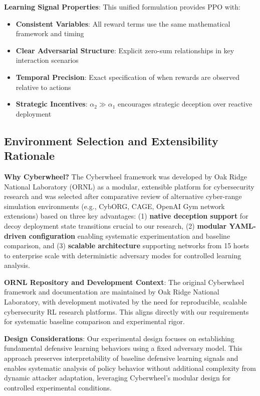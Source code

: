 \documentclass[12pt,oneside]{article}
\begin{document}
\textbf{Learning Signal Properties}:
This unified formulation provides PPO with:
\begin{itemize}
\item \textbf{Consistent Variables}: All reward terms use the same mathematical framework and timing
\item \textbf{Clear Adversarial Structure}: Explicit zero-sum relationships in key interaction scenarios
\item \textbf{Temporal Precision}: Exact specification of when rewards are observed relative to actions
\item \textbf{Strategic Incentives}: $\alpha_2 \gg \alpha_1$ encourages strategic deception over reactive deployment
\end{itemize}


\subsection{Environment Selection and Extensibility Rationale}

\textbf{Why Cyberwheel?} The Cyberwheel framework was developed by Oak Ridge National Laboratory (ORNL) as a modular, extensible platform for cybersecurity research and was selected after comparative review of alternative cyber-range simulation environments (e.g., CybORG, CAGE, OpenAI Gym network extensions) based on three key advantages: (1) \textbf{native deception support} for decoy deployment state transitions crucial to our research, (2) \textbf{modular YAML-driven configuration} enabling systematic experimentation and baseline comparison, and (3) \textbf{scalable architecture} supporting networks from 15 hosts to enterprise scale with deterministic adversary modes for controlled learning analysis.

\textbf{ORNL Repository and Development Context}: The original Cyberwheel framework and documentation are maintained by Oak Ridge National Laboratory, with development motivated by the need for reproducible, scalable cybersecurity RL research platforms. This aligns directly with our requirements for systematic baseline comparison and experimental rigor.

\textbf{Design Considerations}: Our experimental design focuses on establishing fundamental defensive learning behaviors using a fixed adversary model. This approach preserves interpretability of baseline defensive learning signals and enables systematic analysis of policy behavior without additional complexity from dynamic attacker adaptation, leveraging Cyberwheel's modular design for controlled experimental conditions.
\end{document}
